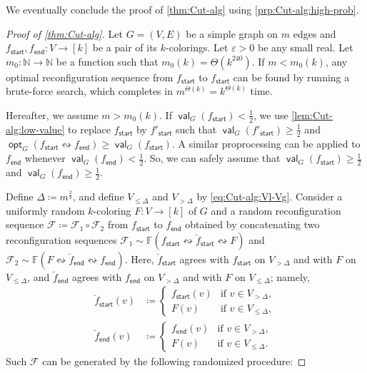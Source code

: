 \documentclass[11pt,fleqn]{article}
\renewcommand{\geq}{\geqslant}
\renewcommand{\leq}{\leqslant}
\renewcommand{\epsilon}{\varepsilon}
\newcommand{\reco}{\leftrightsquigarrow}
\newcommand{\defeq}{\coloneq}
\DeclareMathOperator{\val}{\mathsf{val}}
\DeclareMathOperator{\opt}{\mathsf{opt}}
\newcommand{\sss}{\mathsf{start}}
\newcommand{\ttt}{\mathsf{end}}
\newcommand{\f}{f}
\newcommand{\frnd}{F}
\newcommand{\sqcol}{\scrF}
\newcommand{\stsqcol}{\bbF}
\newcommand{\Vl}{V_{\leq \Delta}}
\newcommand{\Vg}{V_{> \Delta}}
\newcommand{\bbF}{\mathbb{F}}
\newcommand{\bbN}{\mathbb{N}}
\newcommand{\scrF}{\mathscr{F}}
\theoremstyle{definition}
\numberwithin{equation}{section}
\begin{document}
We eventually conclude the proof of \cref{thm:Cut-alg} using \cref{prp:Cut-alg:high-prob}.

\begin{proof}[Proof of \cref{thm:Cut-alg}]
Let $G=(V,E)$ be a simple graph on $m$ edges and
    $\f_\sss,\f_\ttt \colon V \to [k]$ be a pair of its $k$-colorings.
Let $\epsilon > 0$ be any small real.
Let $m_0 \colon \bbN \to \bbN$ be a function such that
    $m_0(k) = \Theta\left(k^{240}\right)$.
If $m < m_0(k)$,
any optimal reconfiguration sequence from $\f_\sss$ to $\f_\sss$
can be found by running a brute-force search,
which completes in $m^{\Theta(k)} = k^{\Theta(k)}$ time.

Hereafter, we assume $m > m_0(k)$.
If $\val_G(\f_\sss) < \frac{1}{2}$,
we use \cref{lem:Cut-alg:low-value} to replace $\f_\sss$ by $\f'_\sss$
such that $\val_G(\f'_\sss) \geq \frac{1}{2}$ and
$\opt_G(\f_\sss \reco \f_\ttt) \geq \val_G(\f_\sss)$.
A similar proprocessing can be applied to $\f_\ttt$ whenever $\val_G(\f_\ttt) < \frac{1}{2}$.
So, we can safely assume that
$\val_G(\f_\sss) \geq \frac{1}{2}$ and
$\val_G(\f_\ttt) \geq \frac{1}{2}$.

Define $\Delta \defeq m^\frac{2}{3}$, and
define $\Vl$ and $\Vg$ by \cref{eq:Cut-alg:Vl-Vg}.
Consider a uniformly random $k$-coloring $\frnd \colon V \to [k]$ of $G$ and
a random reconfiguration sequence
$\sqcol \defeq \sqcol_1 \circ \sqcol_2$
from $\f_\sss$ to $\f_\ttt$
obtained by concatenating
two reconfiguration sequences
$\sqcol_1 \sim \stsqcol(\f_\sss \reco \breve{\f}_\sss \reco \frnd)$ and
$\sqcol_2 \sim \stsqcol(\frnd \reco \breve{\f}_\ttt \reco \f_\ttt)$.
Here, $\breve{\f}_\sss$ agrees
with $\f_\sss$ on $\Vg$ and
with $\frnd$ on $\Vl$, and
$\breve{\f}_\ttt$ agrees 
with $\f_\ttt$ on $\Vg$ and
with $\frnd$ on $\Vl$; namely,
\begin{align}
    \breve{\f}_\sss(v) & \defeq
    \begin{cases}
        \f_\sss(v) & \text{if } v \in \Vg, \\
        \frnd(v) & \text{if } v \in \Vl,
    \end{cases} \\
    \breve{\f}_\ttt(v) & \defeq
    \begin{cases}
        \f_\ttt(v) & \text{if } v \in \Vg, \\
        \frnd(v) & \text{if } v \in \Vl.
    \end{cases}
\end{align}
Such $\sqcol$ can be generated by the following randomized procedure:


\end{proof}
\end{document}
